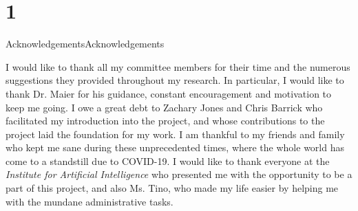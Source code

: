 \chapter{1}{Acknowledgements}{Acknowledgements}
\par I would like to thank all my committee members for their time and the numerous suggestions they provided throughout my research. In particular, I would like to thank Dr. Maier for his guidance, constant encouragement and motivation to keep me going. I owe a great debt to Zachary Jones and Chris Barrick who facilitated my introduction into the project, and whose contributions to the project laid the foundation for my work. I am thankful to my friends and family who kept me sane during these unprecedented times, where the whole world has come to a standstill due to COVID-19. I would like to thank everyone at the \textit{Institute for Artificial Intelligence} who presented me with the opportunity to be a part of this project, and also Ms. Tino, who made my life easier by helping me with the mundane administrative tasks.

\newpage